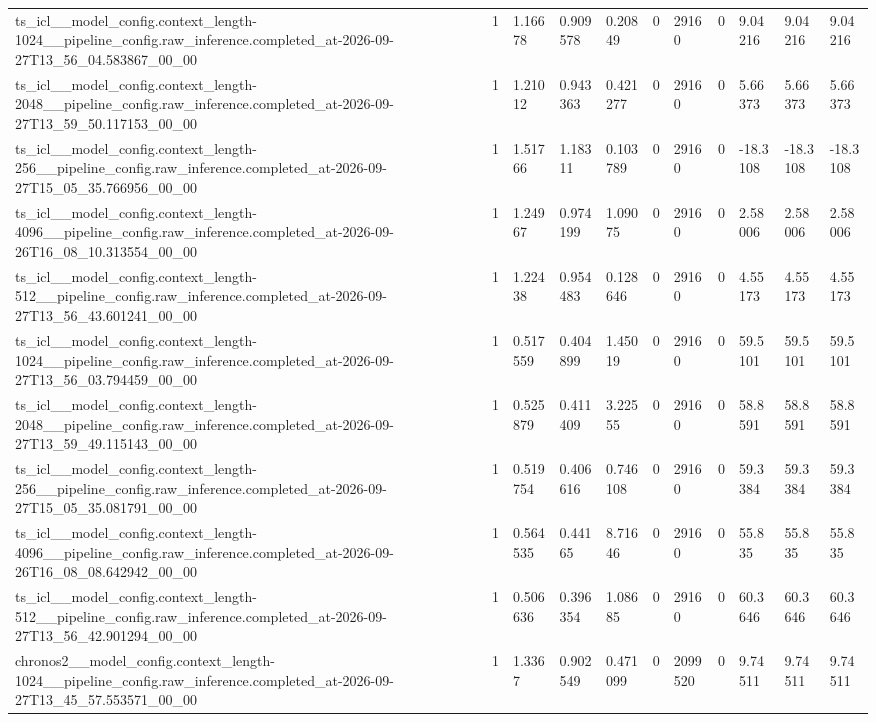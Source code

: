 \begin{tabular}{lllllllllll}
ts\_icl\_\_model\_config.context\_length-1024\_\_pipeline\_config.raw\_inference.completed\_at-2026-09-27T13\_56\_04.583867\_00\_00 & 1 & 1.16678 & 0.909578 & 0.20849 & 0 & 29160 & 0 & 9.04216 & 9.04216 & 9.04216 \\
ts\_icl\_\_model\_config.context\_length-2048\_\_pipeline\_config.raw\_inference.completed\_at-2026-09-27T13\_59\_50.117153\_00\_00 & 1 & 1.21012 & 0.943363 & 0.421277 & 0 & 29160 & 0 & 5.66373 & 5.66373 & 5.66373 \\
ts\_icl\_\_model\_config.context\_length-256\_\_pipeline\_config.raw\_inference.completed\_at-2026-09-27T15\_05\_35.766956\_00\_00 & 1 & 1.51766 & 1.18311 & 0.103789 & 0 & 29160 & 0 & -18.3108 & -18.3108 & -18.3108 \\
ts\_icl\_\_model\_config.context\_length-4096\_\_pipeline\_config.raw\_inference.completed\_at-2026-09-26T16\_08\_10.313554\_00\_00 & 1 & 1.24967 & 0.974199 & 1.09075 & 0 & 29160 & 0 & 2.58006 & 2.58006 & 2.58006 \\
ts\_icl\_\_model\_config.context\_length-512\_\_pipeline\_config.raw\_inference.completed\_at-2026-09-27T13\_56\_43.601241\_00\_00 & 1 & 1.22438 & 0.954483 & 0.128646 & 0 & 29160 & 0 & 4.55173 & 4.55173 & 4.55173 \\
ts\_icl\_\_model\_config.context\_length-1024\_\_pipeline\_config.raw\_inference.completed\_at-2026-09-27T13\_56\_03.794459\_00\_00 & 1 & 0.517559 & 0.404899 & 1.45019 & 0 & 29160 & 0 & 59.5101 & 59.5101 & 59.5101 \\
ts\_icl\_\_model\_config.context\_length-2048\_\_pipeline\_config.raw\_inference.completed\_at-2026-09-27T13\_59\_49.115143\_00\_00 & 1 & 0.525879 & 0.411409 & 3.22555 & 0 & 29160 & 0 & 58.8591 & 58.8591 & 58.8591 \\
ts\_icl\_\_model\_config.context\_length-256\_\_pipeline\_config.raw\_inference.completed\_at-2026-09-27T15\_05\_35.081791\_00\_00 & 1 & 0.519754 & 0.406616 & 0.746108 & 0 & 29160 & 0 & 59.3384 & 59.3384 & 59.3384 \\
ts\_icl\_\_model\_config.context\_length-4096\_\_pipeline\_config.raw\_inference.completed\_at-2026-09-26T16\_08\_08.642942\_00\_00 & 1 & 0.564535 & 0.44165 & 8.71646 & 0 & 29160 & 0 & 55.835 & 55.835 & 55.835 \\
ts\_icl\_\_model\_config.context\_length-512\_\_pipeline\_config.raw\_inference.completed\_at-2026-09-27T13\_56\_42.901294\_00\_00 & 1 & 0.506636 & 0.396354 & 1.08685 & 0 & 29160 & 0 & 60.3646 & 60.3646 & 60.3646 \\
chronos2\_\_model\_config.context\_length-1024\_\_pipeline\_config.raw\_inference.completed\_at-2026-09-27T13\_45\_57.553571\_00\_00 & 1 & 1.3367 & 0.902549 & 0.471099 & 0 & 2099520 & 0 & 9.74511 & 9.74511 & 9.74511 \\

\end{tabular}
